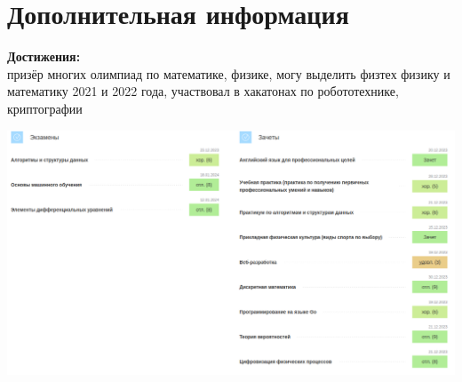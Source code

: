 \documentclass[a4paper,10pt]{article}
\begin{document}
\section*{Дополнительная информация}
\noindent
\textbf{Достижения:} \\ призёр многих олимпиад по математике, физике, могу выделить физтех физику и математику 2021 и 2022 года, участвовал в хакатонах по робототехнике, криптографии


\begin{center}
  \includegraphics[scale = 0.5]{pic1.png}
\end{center}
\end{document}
